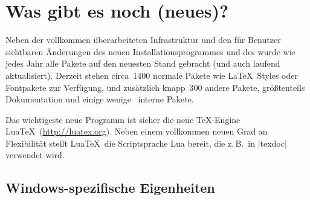 \section{Was gibt es noch (neues)?}

Neben der vollkommen überarbeiteten Infrastruktur und den für Benutzer
sichtbaren Änderungen des neuen Installationsprogrammes und 
des \tlmgr wurde wie jedes Jahr alle Pakete auf den neuesten Stand 
gebracht (und auch laufend aktualisiert). Derzeit stehen circa~1400
normale Pakete wie \LaTeX\ Styles oder Fontpakete zur Verfügung, und 
zusätzlich knapp~300 andere Pakete, größtenteils Dokumentation und 
einige wenige \tl\ interne Pakete.

Das wichtigeste neue Programm ist sicher die neue \TeX-Engine Lua\TeX\
(\url{http://luatex.org}). Neben einem vollkommen neuen Grad an
Flexibilität stellt Lua\TeX\ die Scriptsprache Lua bereit, die z.\,B.\ in
|texdoc| verwendet wird.

\subsection{Windows-spezifische Eigenheiten}

